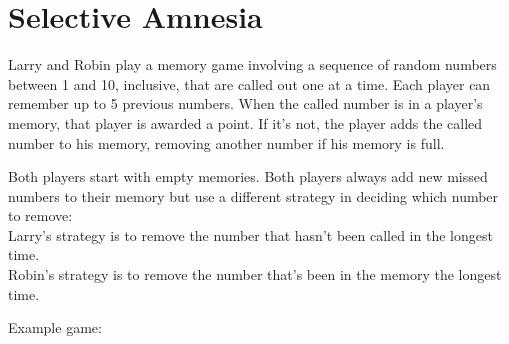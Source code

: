 \section[Problem \#298: Selective Amnesia]{Selective Amnesia}
\label{sec:problem_298}

Larry and Robin play a memory game involving a sequence of random
numbers between 1 and 10, inclusive, that are called out one at a time.
Each player can remember up to 5 previous numbers. When the called
number is in a player's memory, that player is awarded a point. If it's
not, the player adds the called number to his memory, removing another
number if his memory is full.

Both players start with empty memories. Both players always add new
missed numbers to their memory but use a different strategy in deciding
which number to remove:\\
Larry's strategy is to remove the number that hasn't been called in the
longest time.\\
Robin's strategy is to remove the number that's been in the memory the
longest time.

Example game:


